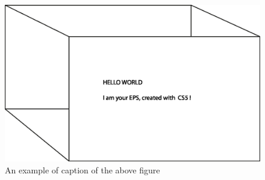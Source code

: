 \documentclass[11pt]{article}
\begin{document}
\clearpage
\begin{figure}
\includegraphics[width=\linewidth]{bild-01.eps}
\caption{An example of caption of the above figure}
\end{figure}
\end{document}
